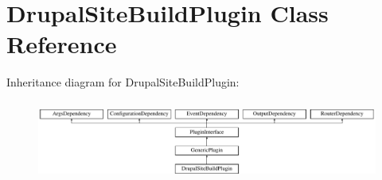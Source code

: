 \hypertarget{classDrupalSiteBuildPlugin}{\section{Drupal\-Site\-Build\-Plugin Class Reference}
\label{classDrupalSiteBuildPlugin}
}
Inheritance diagram for Drupal\-Site\-Build\-Plugin\-:\begin{figure}[H]
\begin{center}
\leavevmode
\includegraphics[height=2.666667cm]{classDrupalSiteBuildPlugin}
\end{center}
\end{figure}
